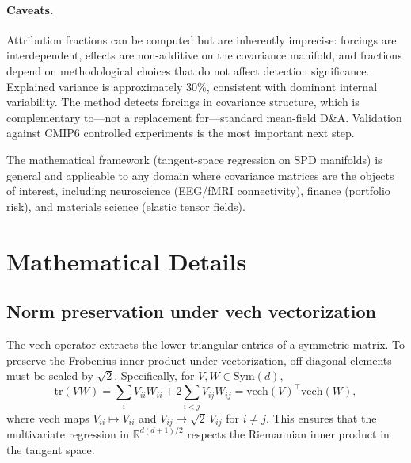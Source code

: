 \documentclass[preprint,12pt]{elsarticle}
\newcommand{\Sym}{\mathrm{Sym}}
\newcommand{\tr}{\mathrm{tr}}
\newcommand{\vech}{\mathrm{vech}}
\newcommand{\RR}{\mathbb{R}}
\begin{document}
\paragraph{Caveats.}
Attribution fractions can be computed but are inherently imprecise: forcings are interdependent, effects are non-additive on the covariance manifold, and fractions depend on methodological choices that do not affect detection significance.
Explained variance is approximately 30\%, consistent with dominant internal variability.
The method detects forcings in covariance structure, which is complementary to---not a replacement for---standard mean-field D\&A.
Validation against CMIP6 controlled experiments is the most important next step.

The mathematical framework (tangent-space regression on SPD manifolds) is general and applicable to any domain where covariance matrices are the objects of interest, including neuroscience (EEG/fMRI connectivity), finance (portfolio risk), and materials science (elastic tensor fields).


\appendix

\makeatletter
\renewcommand{\thefigure}{\thesection\arabic{figure}}
\renewcommand{\thetable}{\thesection\arabic{table}}
\makeatother

\section{Mathematical Details}\label{app:math}

\subsection{Norm preservation under vech vectorization}

The $\vech$ operator extracts the lower-triangular entries of a symmetric matrix.
To preserve the Frobenius inner product under vectorization, off-diagonal elements must be scaled by $\sqrt{2}$.
Specifically, for $V, W \in \Sym(d)$,
\begin{equation}
\tr(V W) = \sum_{i} V_{ii} W_{ii} + 2 \sum_{i < j} V_{ij} W_{ij} = \vech(V)^\top \vech(W),
\end{equation}
where $\vech$ maps $V_{ii} \mapsto V_{ii}$ and $V_{ij} \mapsto \sqrt{2}\, V_{ij}$ for $i \neq j$.
This ensures that the multivariate regression in $\RR^{d(d+1)/2}$ respects the Riemannian inner product in the tangent space.
\end{document}
